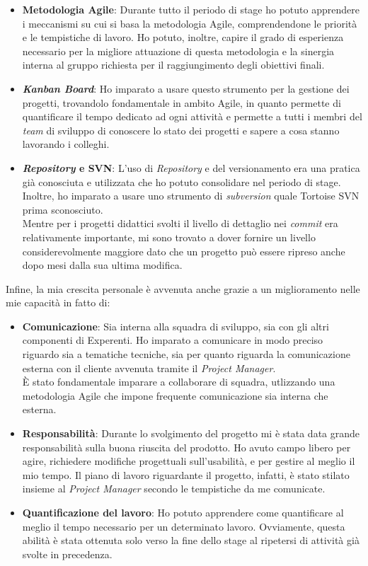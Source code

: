 \begin{itemize}
	\item \textbf{Metodologia Agile}: Durante tutto il periodo di stage ho potuto apprendere i meccanismi su cui si basa la metodologia Agile, comprendendone le priorit\`a e le tempistiche di lavoro. Ho potuto, inoltre, capire il grado di esperienza necessario per la migliore attuazione di questa metodologia e la sinergia interna al gruppo richiesta per il raggiungimento degli obiettivi finali.
	
	\item \textbf{\textit{Kanban Board}}: Ho imparato a usare questo strumento per la gestione dei progetti, trovandolo fondamentale in ambito Agile, in quanto permette di quantificare il tempo dedicato ad ogni attivit\`a e permette a tutti i membri del \textit{team} di sviluppo di conoscere lo stato dei progetti e sapere a cosa stanno lavorando i colleghi.
	
	\item \textbf{\textit{Repository} e SVN}: L'uso di \textit{Repository} e del versionamento era una pratica gi\`a conosciuta e utilizzata che ho potuto consolidare nel periodo di stage. Inoltre, ho imparato a usare uno strumento di \textit{subversion} quale Tortoise SVN prima sconosciuto.\\
	Mentre per i progetti didattici svolti il livello di dettaglio nei \textit{commit} era relativamente importante, mi sono trovato a dover fornire un livello considerevolmente maggiore dato che un progetto pu\`o essere ripreso anche dopo mesi dalla sua ultima modifica.
\end{itemize}
\noindent
Infine, la mia crescita personale \`e avvenuta anche grazie a un miglioramento nelle mie capacit\`a in fatto di:

\begin{itemize}
	\item \textbf{Comunicazione}: Sia interna alla squadra di sviluppo, sia con gli altri componenti di Experenti. Ho imparato a comunicare in modo preciso riguardo sia a tematiche tecniche, sia per quanto riguarda la comunicazione esterna con il cliente avvenuta tramite il \textit{Project Manager}.\\
	\`E stato fondamentale imparare a collaborare di squadra, utlizzando una metodologia Agile che impone frequente comunicazione sia interna che esterna.
	
	\item \textbf{Responsabilit\`a}: Durante lo svolgimento del progetto mi \`e stata data grande responsabilit\`a sulla buona riuscita del prodotto. Ho avuto campo libero per agire, richiedere modifiche progettuali sull'usabilit\`a, e per gestire al meglio il mio tempo. Il piano di lavoro riguardante il progetto, infatti, \`e stato stilato insieme al \textit{Project Manager} secondo le tempistiche da me comunicate.
	
	\item \textbf{Quantificazione del lavoro}: Ho potuto apprendere come quantificare al meglio il tempo necessario per un determinato lavoro. Ovviamente, questa abilit\`a \`e stata ottenuta solo verso la fine dello stage al ripetersi di attivit\`a gi\`a svolte in precedenza.
\end{itemize}

